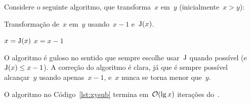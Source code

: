 \documentclass[main.tex]{subfiles}
\begin{document}
Considere o seguinte algoritmo, que transforma~$x$ em~$y$ (inicialmente~$x > y$):
\begin{algorithm}[h]
\caption{Transformação de~$x$ em~$y$ usando~$x-1$ e~$\operatorname{J}(x)$. \label{lst:xysub}}
\begin{algorithmic}[1]
			\State $x = \operatorname{J}(x)$
		\Else
			\State $x = x - 1$
		\EndIf
	\EndWhile
\end{algorithmic}
\end{algorithm}

O algoritmo é guloso no sentido que sempre escolhe usar~$\operatorname{J}$ quando possível (e~${\operatorname{J}(x) \leq x - 1}$). A correção do algoritmo é clara, já que é sempre possível alcançar~$y$ usando apenas~$x-1$, e~$x$ nunca se torna menor que~$y$.

\begin{theorem} \label{thm:xysub}
	O algoritmo no Código~\ref{lst:xysub} termina em~$\mathcal{O}(\lg x)$ iterações do~.
\end{theorem}
\end{document}
